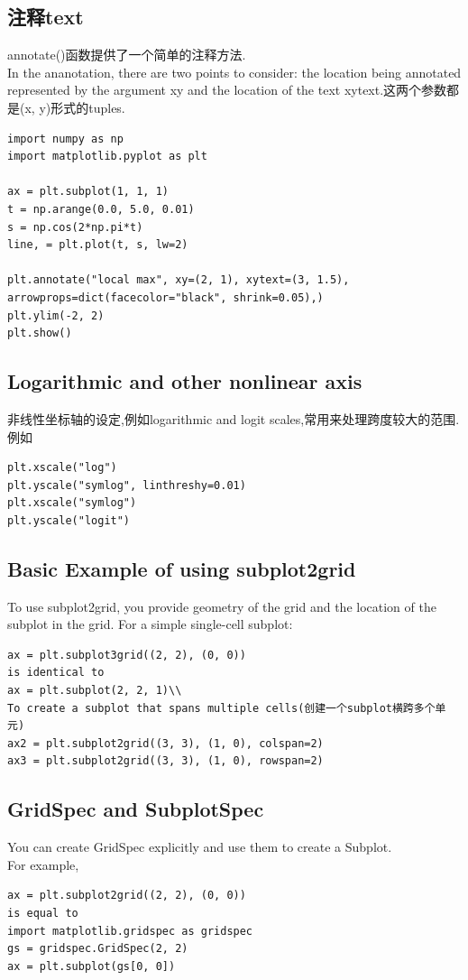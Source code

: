 \subsection{注释text}
annotate()函数提供了一个简单的注释方法.\\
In the ananotation, there are two points to consider: the location being annotated represented by the argument xy and
the location of the text xytext.这两个参数都是(x, y)形式的tuples.\\
\begin{lstlisting}
import numpy as np
import matplotlib.pyplot as plt

ax = plt.subplot(1, 1, 1)
t = np.arange(0.0, 5.0, 0.01)
s = np.cos(2*np.pi*t)
line, = plt.plot(t, s, lw=2)

plt.annotate("local max", xy=(2, 1), xytext=(3, 1.5), arrowprops=dict(facecolor="black", shrink=0.05),)
plt.ylim(-2, 2)
plt.show()
\end{lstlisting}

\subsection{Logarithmic and other nonlinear axis}
非线性坐标轴的设定,例如logarithmic and logit scales,常用来处理跨度较大的范围.\\
例如
\begin{lstlisting}
plt.xscale("log")
plt.yscale("symlog", linthreshy=0.01)
plt.xscale("symlog")
plt.yscale("logit")
\end{lstlisting}

\subsection{Basic Example of using subplot2grid}
To use subplot2grid, you provide geometry of the grid and the location of the subplot in the grid. For a simple
single-cell subplot:\\
\begin{verbatim}
ax = plt.subplot3grid((2, 2), (0, 0))
is identical to
ax = plt.subplot(2, 2, 1)\\
To create a subplot that spans multiple cells(创建一个subplot横跨多个单元)
ax2 = plt.subplot2grid((3, 3), (1, 0), colspan=2)
ax3 = plt.subplot2grid((3, 3), (1, 0), rowspan=2)
\end{verbatim}

\subsection{GridSpec and SubplotSpec}
You can create GridSpec explicitly and use them to create a Subplot.\\
For example,
\begin{lstlisting}
ax = plt.subplot2grid((2, 2), (0, 0))
is equal to
import matplotlib.gridspec as gridspec
gs = gridspec.GridSpec(2, 2)
ax = plt.subplot(gs[0, 0])
\end{lstlisting}


